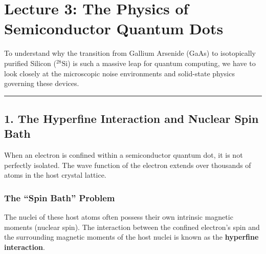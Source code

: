 \documentclass[
]{article}
\begin{document}
\section{Lecture 3: The Physics of Semiconductor Quantum
Dots}\label{lecture-3-the-physics-of-semiconductor-quantum-dots}

To understand why the transition from Gallium Arsenide (GaAs) to
isotopically purified Silicon (\(^{28}\text{Si}\)) is such a massive
leap for quantum computing, we have to look closely at the microscopic
noise environments and solid-state physics governing these devices.

\begin{center}\rule{0.5\linewidth}{0.5pt}\end{center}

\subsection{1. The Hyperfine Interaction and Nuclear Spin
Bath}\label{the-hyperfine-interaction-and-nuclear-spin-bath}

When an electron is confined within a semiconductor quantum dot, it is
not perfectly isolated. The wave function of the electron extends over
thousands of atoms in the host crystal lattice.

\subsubsection{The ``Spin Bath'' Problem}\label{the-spin-bath-problem}

The nuclei of these host atoms often possess their own intrinsic
magnetic moments (nuclear spin). The interaction between the confined
electron's spin and the surrounding magnetic moments of the host nuclei
is known as the \textbf{hyperfine interaction}.
\end{document}
